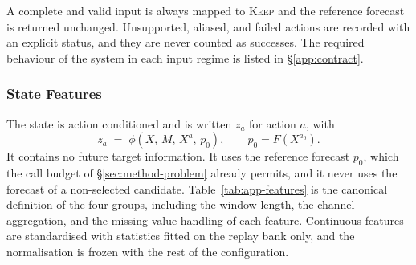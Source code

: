 \documentclass{article}
\begin{document}
A complete and valid input is always mapped to \textsc{Keep} and the reference forecast is
returned unchanged. Unsupported, aliased, and failed actions are recorded with an explicit
status, and they are never counted as successes. The required behaviour of the system in each
input regime is listed in \S\ref{app:contract}.

\subsubsection{State Features}
\label{app:features}
The state is action conditioned and is written $z_a$ for action $a$, with
\begin{equation}
  z_a \;=\; \phi\!\left(X,\, M,\, X^{a},\, p_0\right),
  \qquad p_0 = F(X^{a_0}) .
  \label{eq:app-state}
\end{equation}
It contains no future target information. It uses the reference forecast $p_0$, which the
call budget of \S\ref{sec:method-problem} already permits, and it never uses the forecast of a
non-selected candidate. Table~\ref{tab:app-features} is the canonical definition of the four
groups, including the window length, the channel aggregation, and the missing-value handling
of each feature. Continuous features are standardised with statistics fitted on the replay
bank only, and the normalisation is frozen with the rest of the configuration.
\end{document}
